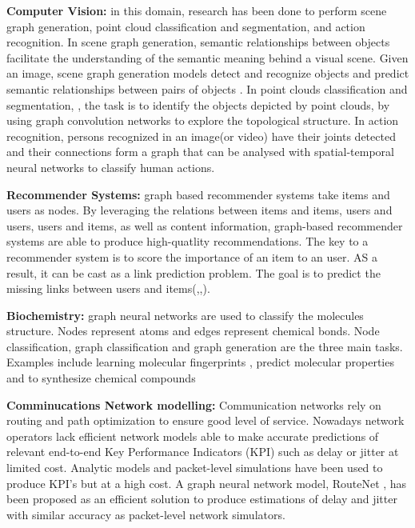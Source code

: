 \textbf{Computer Vision:} in this domain, research has been done to perform scene graph generation, point cloud classification and segmentation, and action recognition. In scene graph generation, semantic relationships between objects facilitate the understanding of the semantic meaning behind a visual scene. Given an image, scene graph generation models detect and recognize objects and predict semantic relationships between pairs of objects \cite{121}. In point clouds classification and segmentation, \cite{125}, the task is to identify the objects depicted by point clouds, by using graph convolution networks to explore the topological structure. In action recognition, persons recognized in an image(or video) have their joints detected and their connections form a graph that can be analysed with spatial-temporal neural networks to classify human actions.

\textbf{Recommender Systems:} graph based recommender systems take items and users as nodes. By leveraging the relations between items and items, users and users, users and items, as well as content information, graph-based recommender systems are able to produce high-quatlity recommendations. The key to a recommender system is to score the importance of an item to an user. AS a result, it can be cast as a link prediction problem. The goal is to predict the missing links between users and items(\cite{9},\cite{10},\cite{11}).

\textbf{Biochemistry:} graph neural networks are used to classify the molecules structure. Nodes represent atoms and edges represent chemical bonds. Node classification, graph classification and graph generation are the three main tasks. Examples include learning molecular fingerprints \cite{52}, predict molecular properties \cite{mpnn} and to synthesize chemical compounds \cite{65}


\textbf{Comminucations Network modelling:} Communication networks rely on routing and path optimization to ensure good level of service. Nowadays network operators lack efficient network models able to make accurate predictions of relevant end-to-end Key Performance Indicators (KPI) such as delay or jitter at limited cost. Analytic models and packet-level simulations have been used to produce KPI's but at a high cost. A graph neural network model, RouteNet \cite{rusek2019unveiling}, has been proposed as an efficient solution to produce estimations of delay and jitter with similar accuracy as packet-level network simulators.


